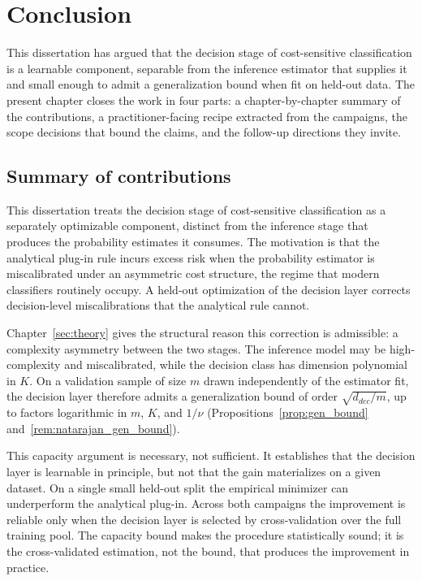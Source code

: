 \chapter{Conclusion}\label{sec:conclusion}

This dissertation has argued that the decision stage of cost-sensitive classification is a learnable component, separable from the inference estimator that supplies it and small enough to admit a generalization bound when fit on held-out data. The present chapter closes the work in four parts: a chapter-by-chapter summary of the contributions, a practitioner-facing recipe extracted from the campaigns, the scope decisions that bound the claims, and the follow-up directions they invite.

\section{Summary of contributions}

This dissertation treats the decision stage of cost-sensitive classification as a separately optimizable component, distinct from the inference stage that produces the probability estimates it consumes. The motivation is that the analytical plug-in rule incurs excess risk when the probability estimator is miscalibrated under an asymmetric cost structure, the regime that modern classifiers routinely occupy. A held-out optimization of the decision layer corrects decision-level miscalibrations that the analytical rule cannot.

Chapter~\ref{sec:theory} gives the structural reason this correction is admissible: a complexity asymmetry between the two stages. The inference model may be high-complexity and miscalibrated, while the decision class has dimension polynomial in $K$. On a validation sample of size $m$ drawn independently of the estimator fit, the decision layer therefore admits a generalization bound of order $\sqrt{d_{dec}/m}$, up to factors logarithmic in $m$, $K$, and $1/\nu$ (Propositions~\ref{prop:gen_bound} and~\ref{rem:natarajan_gen_bound}).

This capacity argument is necessary, not sufficient. It establishes that the decision layer is learnable in principle, but not that the gain materializes on a given dataset. On a single small held-out split the empirical minimizer can underperform the analytical plug-in. Across both campaigns the improvement is reliable only when the decision layer is selected by cross-validation over the full training pool. The capacity bound makes the procedure statistically sound; it is the cross-validated estimation, not the bound, that produces the improvement in practice.

